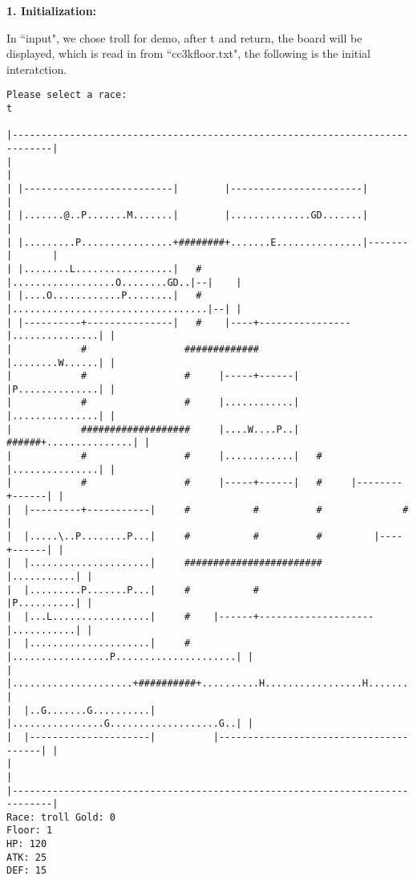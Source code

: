 \documentclass[11pt]{article}
\theoremstyle{plain}
\begin{document}
\textbf{1. Initialization:}

In ``input", we chose troll for demo, after t and return, the board will be 
displayed, which is read in from ``cc3kfloor.txt", the following is the initial
interatction.
\begin{Verbatim}[fontsize=\scriptsize]
Please select a race:
t

|-----------------------------------------------------------------------------|
|                                                                             |
| |--------------------------|        |-----------------------|               |
| |.......@..P.......M.......|        |..............GD.......|               |
| |.........P................+########+.......E...............|-------|       |
| |........L.................|   #    |..................O........GD..|--|    |
| |....O............P........|   #    |..................................|--| |
| |----------+---------------|   #    |----+----------------|...............| |
|            #                 #############                |........W......| |
|            #                 #     |-----+------|         |P..............| |
|            #                 #     |............|         |...............| |
|            ###################     |....W....P..|   ######+...............| |
|            #                 #     |............|   #     |...............| |
|            #                 #     |-----+------|   #     |--------+------| |
|  |---------+-----------|     #           #          #              #        |
|  |.....\..P........P...|     #           #          #         |----+------| |
|  |.....................|     ########################         |...........| |
|  |.........P.......P...|     #           #                    |P..........| |
|  |...L.................|     #    |------+--------------------|...........| |
|  |.....................|     #    |.................P.....................| |
|  |.....................+##########+..........H.................H..........| |
|  |..G.......G..........|          |................G...................G..| |
|  |---------------------|          |---------------------------------------| |
|                                                                             |
|-----------------------------------------------------------------------------|
Race: troll Gold: 0                                                    Floor: 1
HP: 120
ATK: 25
DEF: 15
\end{Verbatim}
\end{document}
